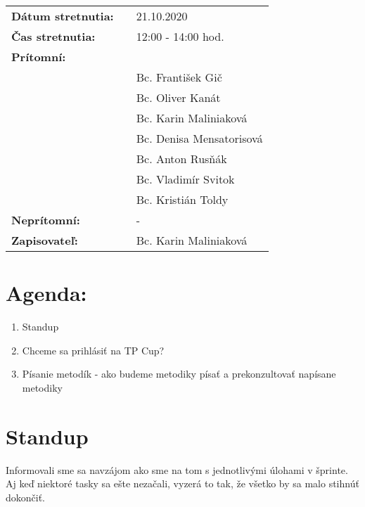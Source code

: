 \documentclass{article}
\begin{document}
    

    \begin{table}[h]
        \begin{tabular}{lllll}
            \multicolumn{3}{l}{\textbf{Dátum stretnutia:}} & & 21.10.2020 \\
            \multicolumn{3}{l}{\textbf{Čas stretnutia:}} & & 12:00 - 14:00 hod. \\
            \multicolumn{3}{l}{\textbf{Prítomní:}} \\
            & & & & Bc. František Gič  \\
            & & & & Bc. Oliver Kanát \\
            & & & & Bc. Karin Maliniaková \\
            & & & & Bc. Denisa Mensatorisová \\
            & & & & Bc. Anton Rusňák \\
            & & & & Bc. Vladimír Svitok \\
            & & & & Bc. Kristián Toldy \\
            \multicolumn{3}{l}{\textbf{Neprítomní:}} & & -\\
            \multicolumn{3}{l}{\textbf{Zapisovateľ:}} & & Bc. Karin Maliniaková \\
        \end{tabular}
        \label{tab:grades}
    \end{table}

    \section*{Agenda:}

    \begin{enumerate}
        \item Standup
        \item Chceme sa prihlásiť na TP Cup?
        \item Písanie metodík - ako budeme metodiky písať a prekonzultovať napísane metodiky
    \end{enumerate}

    \section*{Standup}

    \textnormal {Informovali sme sa navzájom ako sme na tom s jednotlivými úlohami v šprinte. Aj keď niektoré tasky sa ešte nezačali, vyzerá to tak, že všetko by sa malo stihnúť dokončiť.}
\end{document}

